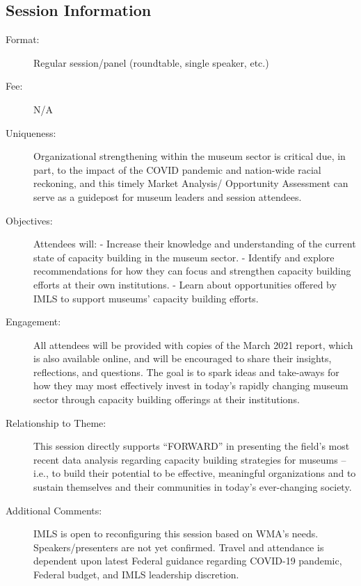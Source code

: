 \documentclass{report}
\begin{document}
              \subsection*{Session Information}
                \begin{description}
                  \item [Format:] Regular session/panel (roundtable, single speaker, etc.)
							    
								  \item [Fee:]N/A
							     
							    \item [Uniqueness:]Organizational strengthening within the museum sector is critical due, in part, to the impact of the COVID pandemic and nation-wide racial reckoning, and this timely Market Analysis/ Opportunity Assessment can serve as a guidepost for museum leaders and session attendees.
							    \item [Objectives:]Attendees will:
- Increase their knowledge and understanding of the current state of capacity building in the museum sector. 
- Identify and explore recommendations for how they can focus and strengthen capacity building efforts at their own institutions.
- Learn about opportunities offered by IMLS to support museums’ capacity building efforts.
							    \item [Engagement:]All attendees will be provided with copies of the March 2021 report, which is also available online, and will be encouraged to share their insights, reflections, and questions. The goal is to spark ideas and take-aways for how they may most effectively invest in today’s rapidly changing museum sector through capacity building offerings at their institutions.
							    \item [Relationship to Theme:]This session directly supports “FORWARD” in presenting the field’s most recent data analysis regarding capacity building strategies for museums – i.e., to build their potential to be effective, meaningful organizations and to sustain themselves and their communities in today’s ever-changing society.
							    
                    \item [Additional Comments: ]IMLS is open to reconfiguring this session based on WMA’s needs. Speakers/presenters are not yet confirmed. Travel and attendance is dependent upon latest Federal guidance regarding COVID-19 pandemic, Federal budget, and IMLS leadership discretion.

                \end{description}
\end{document}
